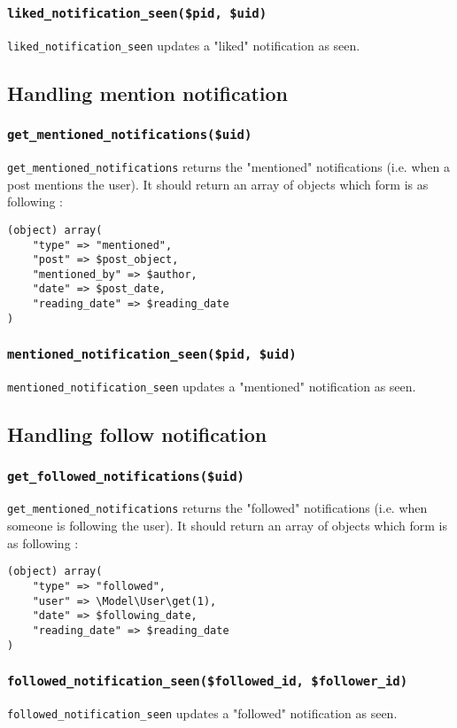\documentclass[twoside,a4paper,12pt]{article}
\begin{document}
\subsubsection{\texttt{liked\_notification\_seen(\$pid, \$uid)}}
\texttt{liked\_notification\_seen} updates a "liked" notification as seen.

\subsection{Handling mention notification}

\subsubsection{\texttt{get\_mentioned\_notifications(\$uid)}}
\texttt{get\_mentioned\_notifications} returns the "mentioned" notifications (i.e. when a post mentions the user). It should return an array of objects which form is as following :
\begin{lstlisting}
(object) array(
    "type" => "mentioned",
    "post" => $post_object,
    "mentioned_by" => $author,
    "date" => $post_date,
    "reading_date" => $reading_date
)
\end{lstlisting}

\subsubsection{\texttt{mentioned\_notification\_seen(\$pid, \$uid)}}
\texttt{mentioned\_notification\_seen} updates a "mentioned" notification as seen.

\subsection{Handling follow notification}

\subsubsection{\texttt{get\_followed\_notifications(\$uid)}}
\texttt{get\_mentioned\_notifications} returns the "followed" notifications (i.e. when someone is following the user). It should return an array of objects which form is as following :

\begin{lstlisting}
(object) array(
    "type" => "followed",
    "user" => \Model\User\get(1),
    "date" => $following_date,
    "reading_date" => $reading_date
)
\end{lstlisting}

\subsubsection{\texttt{followed\_notification\_seen(\$followed\_id, \$follower\_id)}}
\texttt{followed\_notification\_seen} updates a "followed" notification as seen.
\end{document}
